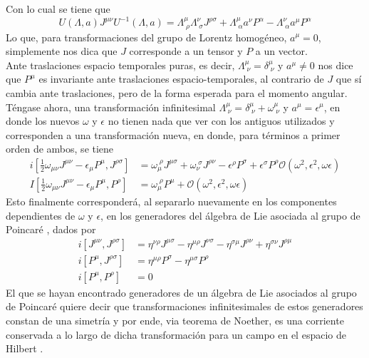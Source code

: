 \documentclass[12pt,letterpaper]{article}
\begin{document}
Con lo cual se tiene que
\begin{equation}
  U(\Lambda,a)J^{\mu\nu}U^{-1}(\Lambda,a) = \Lambda^\mu_{\;\rho} \Lambda^\nu_{\;\sigma} J^{\rho\sigma} + \Lambda^\mu_{\;\alpha}a^\nu P^\alpha - \Lambda^\nu_{\;\alpha} a^\mu P^\alpha
\end{equation}
Lo que, para transformaciones del grupo de Lorentz homogéneo, $a^\mu=0$, simplemente nos dica que $J$ corresponde a un tensor y $P$ a un vector. \\
Ante traslaciones espacio temporales puras, es decir, $\Lambda^\mu_{\;\nu} = \delta^\mu_{\;\nu}$ y $a^\mu\neq 0$ nos dice que $P^\mu$ es invariante ante traslaciones espacio-temporales, al contrario de $J$ que sí cambia ante traslaciones, pero de la forma esperada para el momento angular. \\
Téngase ahora, una transformación infinitesimal $\Lambda^\mu_{\;\nu} = \delta^\mu_{\;\nu} + \omega^\mu_{\;\nu}$ y $a^\mu=\epsilon^\mu$, en donde los nuevos $\omega$ y $\epsilon$ no tienen nada que ver con los antiguos utilizados y corresponden a una transformación nueva, en donde, para términos a primer orden de ambos, se tiene \cite{weinberg-v1}
\begin{align}
  i \left[ \frac{1}{2}\omega_{\mu\nu}J^{\mu\nu} - \epsilon_\mu P^\mu, J^{\rho\sigma} \right] & = \omega^{\;\rho}_\mu J^{\mu\sigma} + \omega^{\;\sigma}_\nu J^{\rho\nu} - \epsilon^\rho P^\sigma + \epsilon^\sigma P^\rho  \mathcal{{O}}(\omega^2,\epsilon^2,\omega\epsilon)\\
  I \left[ \frac{1}{2}\omega_{\mu\nu} J^{\mu\nu} - \epsilon_\mu P^\mu , P^\rho \right] & = \omega^{\;\rho}_\mu P^\mu + \mathcal{{O}}(\omega^2,\epsilon^2,\omega\epsilon)
\end{align}
Esto finalmente corresponderá, al separarlo nuevamente en los componentes dependientes de $\omega$ y $\epsilon$, en los generadores del álgebra de Lie asociada al grupo de Poincaré \cite{weinberg-v1}, dados por
\begin{align}
 i \left[ J^{\mu\nu} , J^{\rho\sigma} \right] & = \eta^{\nu\rho}J^{\mu\sigma} - \eta^{\mu\rho}J^{\nu\sigma} - \eta^{\sigma\mu}J^{\rho\nu} + \eta^{\sigma\nu}J^{\rho\mu} \\
  i \left[ P^\mu , J^{\rho\sigma} \right] & = \eta^{\mu\rho} P^\sigma - \eta^{\mu\sigma} P^\rho \\
  i \left[ P^\mu,P^\rho \right] & =0
\end{align}
El que se hayan encontrado generadores de un álgebra de Lie asociados al grupo de Poincaré quiere decir que transformaciones infinitesimales de estos generadores constan de una simetría y por ende, via teorema de Noether, es una corriente conservada a lo largo de dicha transformación para un campo en el espacio de Hilbert \cite{apunte}. \\
\end{document}
